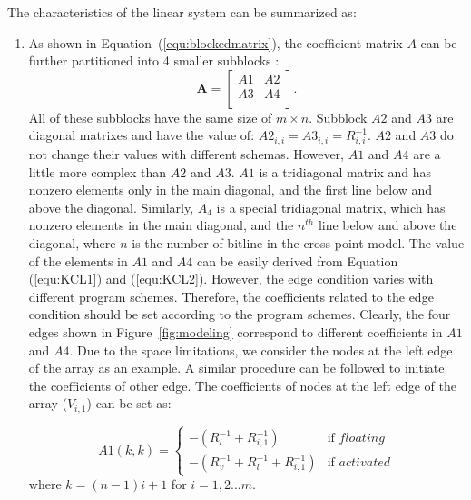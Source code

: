 The characteristics of the linear system can be summarized as:
\begin{enumerate}
  \item
  As shown in Equation~(\ref{equ:blockedmatrix}), the coefficient matrix $A$ can be further partitioned into 4 smaller subblocks :
    \begin{equation}\label{equ:blockedmatrix}
        \mathbf{A} = \left[
        \begin{array}{cc}
            A1 & A2  \\
            A3 & A4  \\
        \end{array} \right].
    \end{equation}
All of these subblocks have the same size of $m\times n$. Subblock
$A2$ and $A3$ are diagonal matrixes and have the value of: $A2_{i,i} =
A3_{i,i} = R_{i,i}^{-1}$. $A2$ and $A3$ do not change their values
with different schemas. However, $A1$ and $A4$ are a little more
complex than $A2$ and $A3$. $A1$ is a tridiagonal matrix and has
nonzero elements only in the main diagonal, and the first line below
and above the diagonal. Similarly, $A_4$ is a special tridiagonal
matrix, which has nonzero elements in the main diagonal, and the
$n^{th}$ line below and above the diagonal, where $n$ is the number of
bitline in the cross-point model. The value of the elements in $A1$
and $A4$ can be easily derived from Equation (\ref{equ:KCL1}) and
(\ref{equ:KCL2}). However, the edge condition varies with different
program schemes. Therefore, the coefficients related to the edge
condition should be set according to the program schemes. Clearly, the
four edges shown in Figure~\ref{fig:modeling} correspond to different
coefficients in $A1$ and $A4$. Due to the space limitations, we
consider the nodes at the left edge of the array as an example. A
similar procedure can be followed to initiate the coefficients of
other edge. The coefficients of nodes at the left edge of the array
($V_{i,1}$) can be set as:

    \begin{equation}
    A1(k,k) = \left\{
    \begin{array}{ll}
    -(R_l^{-1}+R_{i,1}^{-1})   & \text{if } floating\\
    -(R_v^{-1}+R_l^{-1}+R_{i,1}^{-1})& \text{if } activated
    \end{array} \right.
    \end{equation}
    where $k=(n-1)i+1$ for $i=1,2...m$.


\end{enumerate}
